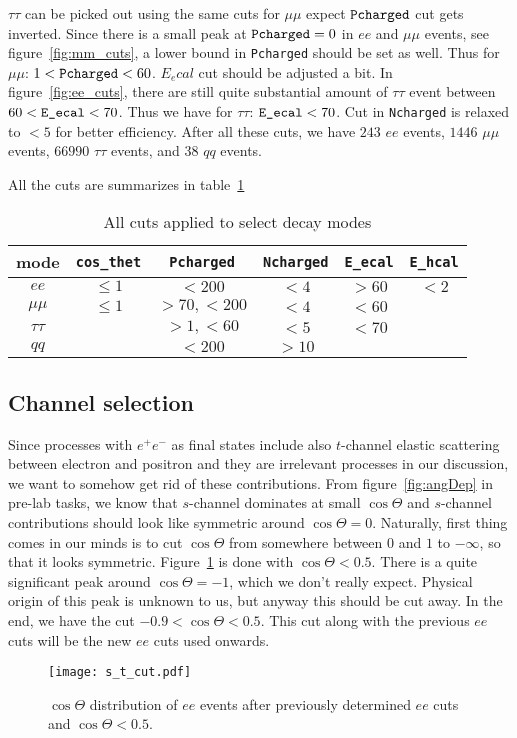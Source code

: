 $\tau\tau$ can be picked out using the same cuts for $\mu\mu$ expect $\verb|Pcharged|$ cut gets inverted. Since there is a small peak at $\verb|Pcharged| = 0$ in $ee$ and $\mu\mu$ events, see figure~\ref{fig:mm_cuts}, a lower bound in \verb|Pcharged| should be set as well. Thus for $\mu\mu$: $1< \verb|Pcharged| < 60$. $E_ecal$ cut should be adjusted a bit. In figure~\ref{fig:ee_cuts}, there are still quite substantial amount of $\tau\tau$ event between $60 < \verb|E_ecal| < 70$. Thus we have for $\tau\tau$: $\verb|E_ecal| < 70$. Cut in \verb|Ncharged| is relaxed to $<5$ for better efficiency. After all these cuts, we have $243$ $ee$ events, $1446$ $\mu\mu$ events, $66990$ $\tau\tau$ events, and $38$ $qq$ events.

All the cuts are summarizes in table~\ref{tab:cuts_all}
\begin{table}[ht]
	\centering
	\begin{tabular}{cccccc}
		\toprule
	mode & \verb|cos_thet| & \verb|Pcharged| & \verb|Ncharged| & \verb|E_ecal| & \verb|E_hcal| \\
	\midrule
	$ee$ & $\leq 1$ & $< 200$ & $< 4$ & $>60$ & $< 2$ \\
	$\mu\mu$ & $\leq 1$ & $>70, <200$ & $<4$ & $<60$ & \\
	$\tau\tau$ & & $>1, <60$ & $<5$ & $<70$ \\
	$qq$ & & $<200$ & $>10$ & & \\
	\bottomrule
	\end{tabular}
	\caption{All cuts applied to select decay modes}
	\label{tab:cuts_all}
\end{table}

\clearpage
\subsection{Channel selection} Since processes with $e^+ e^-$ as final states include also $t$-channel elastic scattering between electron and positron and they are irrelevant processes in our discussion, we want to somehow get rid of these contributions. From figure~\ref{fig:angDep} in pre-lab tasks, we know that $s$-channel dominates at small $\cos\Theta$ and $s$-channel contributions should look like symmetric around $\cos\Theta = 0$. Naturally, first thing comes in our minds is to cut $\cos\Theta$ from somewhere between $0$ and $1$ to $-\infty$, so that it looks symmetric. Figure~\ref{fig:s_t_cut} is done with $\cos\Theta < 0.5$. There is a quite significant peak around $\cos\Theta = -1$, which we don't really expect. Physical origin of this peak is unknown to us, but anyway this should be cut away. In the end, we have the cut $-0.9 < \cos\Theta < 0.5$. This cut along with the previous $ee$ cuts will be the new $ee$ cuts used onwards.
\begin{figure}[ht]
	\centering
	\texttt{[image: s\_t\_cut.pdf]}
	\caption{$\cos\Theta$ distribution of $ee$ events after previously determined $ee$ cuts and $\cos \Theta< 0.5$.}%
	\label{fig:s_t_cut}
\end{figure}

